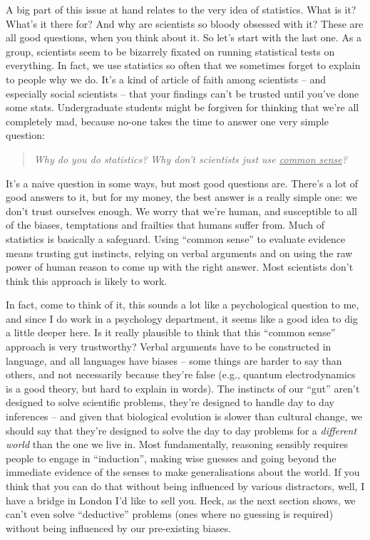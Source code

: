 A big part of this issue at hand relates to the very idea of statistics. What is it? What's it there for? And why are scientists so bloody obsessed with it? These are all good questions, when you think about it. So let's start with the last one. As a group, scientists seem to be bizarrely fixated on running statistical tests on everything. In fact, we use statistics so often that we sometimes forget to explain to people why we do. It's a kind of article of faith among scientists -- and especially social scientists -- that your findings can't be trusted until you've done some stats. Undergraduate students might be forgiven for thinking that we're all completely mad, because no-one takes the time to answer one very simple question:
\begin{quote}
{\it Why do you do statistics? Why don't scientists just use \underline{common sense}?}
\end{quote}
It's a naive question in some ways, but most good questions are. There's a lot of good answers to it, but for my money, the best answer is a really simple one: we don't trust ourselves enough. We worry that we're human, and susceptible to all of the biases, temptations and frailties that humans suffer from. Much of statistics is basically a safeguard. Using ``common sense'' to evaluate evidence means trusting gut instincts, relying on verbal arguments and on using the raw power of human reason to come up with the right answer. Most scientists don't think this approach is likely to work.

In fact, come to think of it, this sounds a lot like a psychological question to me, and since I do work in a psychology department, it seems like a good idea to dig a little deeper here. Is it really plausible to think that this ``common sense'' approach is very trustworthy? Verbal arguments have to be constructed in language, and all languages have biases -- some things are harder to say than others, and not necessarily because they're false (e.g., quantum electrodynamics is a good theory, but hard to explain in words). The instincts of our ``gut'' aren't designed to solve scientific problems, they're designed to handle day to day inferences -- and given that biological evolution is slower than cultural change, we should say that they're designed to solve the day to day problems for a {\it different world} than the one we live in. Most fundamentally, reasoning sensibly requires people to engage in ``induction'', making wise guesses and going beyond the immediate evidence of the senses to make generalisations about the world. If you think that you can do that without being influenced by various distractors, well, I have a bridge in London I'd like to sell you. Heck, as the next section shows, we can't even solve ``deductive'' problems (ones where no guessing is required) without being influenced by our pre-existing biases.


